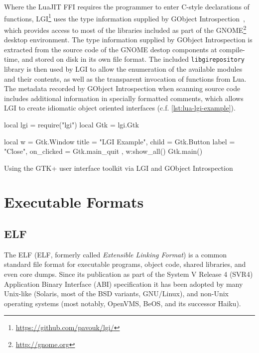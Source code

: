Where the LuaJIT FFI requires the programmer to enter C-style declarations of
functions, LGI\footnote{\url{https://github.com/pavouk/lgi/}} uses the type
information supplied by GObject Introspection~\cite{gobject-introspection},
which provides access to most of the libraries included as part of the
GNOME\footnote{\url{http://gnome.org}} desktop environment. The type
information supplied by GObject Introspection is extracted from the source
code of the GNOME destop components at compile-time, and stored on disk in its
own file format. The included \verb|libgirepository| library is then used by
LGI to allow the enumeration of the available modules and their contents, as
well as the transparent invocation of functions from Lua. The metadata
recorded by GObject Introspection when scanning source code includes
additional information in specially formatted comments, which allows LGI to
create idiomatic object oriented interfaces (c.f. \autoref{lst:lua-lgi-example}).

\begin{listing}[H]
	\begin{luacode}
	local lgi = require("lgi")
	local Gtk = lgi.Gtk

	local w = Gtk.Window {
		title = "LGI Example",
		child = Gtk.Button { label = "Close",
                         on_clicked = Gtk.main_quit },
	}
	w:show_all()
	Gtk.main()
	\end{luacode}
	\caption{Using the GTK+ user interface toolkit via LGI and GObject
	Introspection}
	\label{lst:lua-lgi-example}
\end{listing}

\section{Executable Formats}

\subsection{ELF}
  \label{sec:elf}

The \acrlong{ELF} (ELF, formerly called \emph{Extensible Linking
Format}) is a common standard file format for executable programs, object
code, shared libraries, and even core dumps. Since its publication as part of
the System V Release 4 (SVR4) Application Binary Interface (ABI) specification
\cite[c.~4]{elfspec-sysv}
it has been adopted by many Unix-like (Solaris, most of the BSD variants,
GNU/Linux), and non-Unix operating systems (most notably, OpenVMS, BeOS, and
its successor Haiku).

